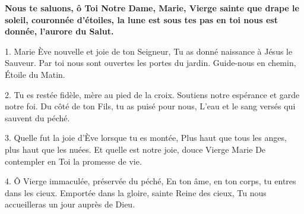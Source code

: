 \textbf{Nous te saluons, ô Toi Notre Dame,
Marie, Vierge sainte que drape le soleil,
couronnée d'étoiles, la lune est sous tes pas
en toi nous est donnée, l'aurore du Salut.}

1. Marie Ève nouvelle et joie de ton Seigneur,
Tu as donné naissance à Jésus le Sauveur.
Par toi nous sont ouvertes les portes du jardin.
Guide-nous en chemin, Étoile du Matin.

2. Tu es restée fidèle, mère au pied de la croix.
Soutiens notre espérance et garde notre foi.
Du côté de ton Fils, tu as puisé pour nous,
L’eau et le sang versés qui sauvent du péché.

3. Quelle fut la joie d’Ève lorsque tu es montée,
Plus haut que tous les anges, plus haut que les nuées.
Et quelle est notre joie, douce Vierge Marie
De contempler en Toi la promesse de vie.

4. Ô Vierge immaculée, préservée du péché,
En ton âme, en ton corps, tu entres dans les cieux.
Emportée dans la gloire, sainte Reine des cieux,
Tu nous accueilleras un jour auprès de Dieu.

